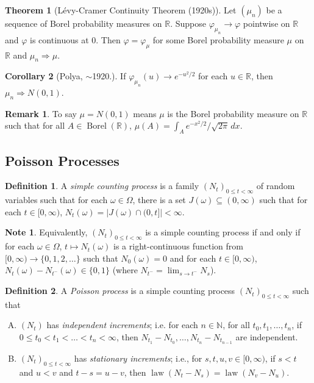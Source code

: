 \documentclass{article}
\DeclareMathOperator{\law}{law}
\DeclareMathOperator{\Borel}{Borel}
\newcommand{\R}{\mathbb{R}}
\newcommand{\N}{\mathbb{N}}
\theoremstyle{definition}
\newtheorem{theorem}{Theorem}
\newtheorem{corollary}[theorem]{Corollary}
\newtheorem*{definition}{Definition}
\newtheorem*{remark}{Remark}
\newtheorem*{note}{Note}
\begin{document}
\begin{theorem}[L\'{e}vy-Cramer Continuity Theorem (1920s)]
Let $(\mu_n)$ be a sequence of Borel probability measures on $\R$. Suppose $\varphi_{\mu_n} \to \varphi$ pointwise on $\R$ and $\varphi$ is continuous at 0. Then $\varphi = \varphi_\mu$ for some Borel probability measure $\mu$ on $\R$ and $\mu_n \Rightarrow \mu$.
\end{theorem}

\begin{corollary}[Polya, $\sim$1920.]
    If $\varphi_{\mu_n}(u) \to e^{-u^2/2}$ for each $u \in \R$, then $\mu_n \Rightarrow N(0,1)$.
\end{corollary}
\begin{remark}
To say $\mu = N(0,1)$ means $\mu$ is the Borel probability measure on $\R$ such that for all $A \in \Borel(\R)$, $\mu(A) = \int_A e^{-x^2/2}/\sqrt{2\pi} \,dx$.
\end{remark}

\subsection*{Poisson Processes}

\begin{definition}
    A \emph{simple counting process} is a family $(N_t)_{0 \leq t < \infty}$ of random variables such that for each $\omega \in \Omega$, there is a set $J(\omega) \subseteq (0, \infty)$ such that for each $t \in [0, \infty)$, $N_t(\omega) = |J(\omega) \cap (0, t]| < \infty$.
\end{definition}
\begin{note}
Equivalently, $(N_t)_{0 \leq t < \infty}$ is a simple counting process if and only if for each $\omega \in \Omega$, $t \mapsto N_t(\omega)$ is a right-continuous function from $[0, \infty) \to \{0, 1, 2, \dots\}$ such that $N_0(\omega) = 0$ and for each $t \in [0, \infty)$, $N_t(\omega) - N_{t^-}(\omega) \in \{0, 1\}$ (where $N_{t^-} = \lim_{s \to t^-} N_s$).
\end{note}

\begin{definition}
    A \emph{Poisson process} is a simple counting process $(N_t)_{0 \leq t < \infty}$ such that
    \begin{enumerate}[(A)]
        \item $(N_t)$ has \emph{independent increments}; i.e. for each $n \in \N$, for all $t_0, t_1, \dots, t_n$, if $0 \leq t_0 < t_1 < \dots < t_n < \infty$, then $N_{t_1} - N_{t_0}, \dots, N_{t_n} - N_{t_{n-1}}$ are independent.
        \item $(N_t)_{0 \leq t < \infty}$ has \emph{stationary increments}; i.e., for $s, t, u, v \in [0, \infty)$, if $s < t$ and $u < v$ and $t - s = u - v$, then $\law(N_t - N_s) = \law(N_v - N_u)$.
    \end{enumerate}
\end{definition}
\end{document}
